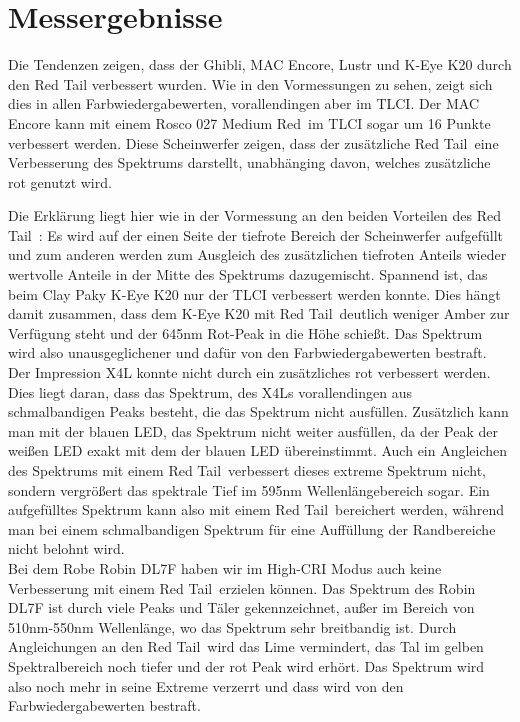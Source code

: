 
\chapter{Messergebnisse}

Die Tendenzen zeigen, dass der Ghibli, MAC Encore, Lustr und K-Eye K20 durch den Red Tail verbessert wurden. Wie in den Vormessungen zu sehen, zeigt sich dies in allen Farbwiedergabewerten, vorallendingen aber im TLCI. Der MAC Encore kann mit einem Rosco 027 \glqq Medium Red\grqq\ im TLCI sogar um 16 Punkte verbessert werden. Diese Scheinwerfer zeigen, dass der zusätzliche \glqq Red Tail\grqq\ eine Verbesserung des Spektrums darstellt, unabhänging davon, welches zusätzliche rot genutzt wird. 

Die Erklärung liegt hier wie in der Vormessung an den beiden Vorteilen des \glqq Red Tail\grqq\ : Es wird auf der einen Seite der tiefrote Bereich der Scheinwerfer aufgefüllt und zum anderen werden zum Ausgleich des zusätzlichen tiefroten Anteils wieder wertvolle Anteile in der Mitte des Spektrums dazugemischt. Spannend ist, das beim Clay Paky K-Eye K20 nur der TLCI verbessert werden konnte. Dies hängt damit zusammen, dass dem K-Eye K20 mit \glqq Red Tail\grqq\ deutlich weniger Amber zur Verfügung steht und der 645nm Rot-Peak in die Höhe schießt. Das Spektrum wird also unausgeglichener und dafür von den Farbwiedergabewerten bestraft.\\
Der Impression X4L konnte nicht durch ein zusätzliches rot verbessert werden. Dies liegt daran, dass das Spektrum, des X4Ls vorallendingen aus schmalbandigen Peaks besteht, die das Spektrum nicht ausfüllen. Zusätzlich kann man mit der blauen LED, das Spektrum nicht weiter ausfüllen, da der Peak der weißen LED exakt mit dem der blauen LED übereinstimmt. Auch ein Angleichen des Spektrums mit einem \glqq Red Tail\grqq\ verbessert dieses extreme Spektrum nicht, sondern vergrößert das spektrale Tief im 595nm Wellenlängebereich sogar. Ein aufgefülltes Spektrum kann also mit einem \glqq Red Tail\grqq\ bereichert werden, während man bei einem schmalbandigen Spektrum für eine Auffüllung der Randbereiche nicht belohnt wird.\\
Bei dem Robe Robin DL7F haben wir im High-CRI Modus auch keine Verbesserung mit einem \glqq Red Tail\grqq\ erzielen können. Das Spektrum des Robin DL7F ist durch viele Peaks und Täler gekennzeichnet, außer im Bereich von 510nm-550nm Wellenlänge, wo das Spektrum sehr breitbandig ist. Durch Angleichungen an den \glqq Red Tail\grqq\ wird das Lime vermindert, das Tal im gelben Spektralbereich noch tiefer und der rot Peak wird erhört. Das Spektrum wird also noch mehr in seine Extreme verzerrt und dass wird von den Farbwiedergabewerten bestraft.

